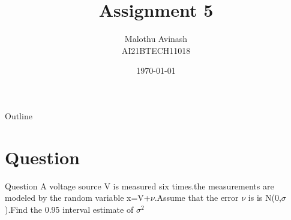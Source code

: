 \documentclass{beamer}
\title{Assignment 5}%
\author{Malothu Avinash \\ AI21BTECH11018}
\date{\today}
\begin{document}
\begin{frame}
    \titlepage 
\end{frame}



\begin{frame}{Outline}
    \tableofcontents
\end{frame}


\section{Question}
\begin{frame}{Question}
A voltage source V is measured six times.the measurements are modeled by the random variable x=V+$\nu$.Assume that the error $\nu$ is is N(0,$\sigma$).Find the 0.95 interval estimate of $\sigma^2$
\end{frame}
\end{document}
